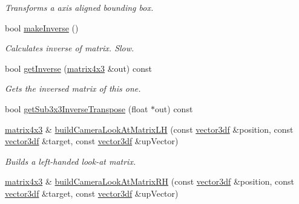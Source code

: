 \begin{DoxyCompactItemize}
\begin{DoxyCompactList}\small\item\em Transforms a axis aligned bounding box. \end{DoxyCompactList}\item 
bool \hyperlink{classirr_1_1core_1_1matrix4x3_a6bfced7bef742a13b927abbb6fc918b1}{make\+Inverse} ()
\begin{DoxyCompactList}\small\item\em Calculates inverse of matrix. Slow. \end{DoxyCompactList}\item 
bool \hyperlink{classirr_1_1core_1_1matrix4x3_aa2da2761e9586ef35b6a626eb1ffbf61}{get\+Inverse} (\hyperlink{classirr_1_1core_1_1matrix4x3}{matrix4x3} \&out) const 
\begin{DoxyCompactList}\small\item\em Gets the inversed matrix of this one. \end{DoxyCompactList}\item 
bool \hyperlink{classirr_1_1core_1_1matrix4x3_ab38d1ed86236532b9853146eae03019a}{get\+Sub3x3\+Inverse\+Transpose} (float $\ast$out) const 
\item 
\hyperlink{classirr_1_1core_1_1matrix4x3}{matrix4x3} \& \hyperlink{classirr_1_1core_1_1matrix4x3_a702d01f5c471c43b051b9f9176d17a4d}{build\+Camera\+Look\+At\+Matrix\+LH} (const \hyperlink{namespaceirr_1_1core_a06f169d08b5c429f5575acb7edbad811}{vector3df} \&position, const \hyperlink{namespaceirr_1_1core_a06f169d08b5c429f5575acb7edbad811}{vector3df} \&target, const \hyperlink{namespaceirr_1_1core_a06f169d08b5c429f5575acb7edbad811}{vector3df} \&up\+Vector)\hypertarget{classirr_1_1core_1_1matrix4x3_a702d01f5c471c43b051b9f9176d17a4d}{}\label{classirr_1_1core_1_1matrix4x3_a702d01f5c471c43b051b9f9176d17a4d}

\begin{DoxyCompactList}\small\item\em Builds a left-\/handed look-\/at matrix. \end{DoxyCompactList}\item 
\hyperlink{classirr_1_1core_1_1matrix4x3}{matrix4x3} \& \hyperlink{classirr_1_1core_1_1matrix4x3_a2e09aa402aa79b259d18f19dc09541eb}{build\+Camera\+Look\+At\+Matrix\+RH} (const \hyperlink{namespaceirr_1_1core_a06f169d08b5c429f5575acb7edbad811}{vector3df} \&position, const \hyperlink{namespaceirr_1_1core_a06f169d08b5c429f5575acb7edbad811}{vector3df} \&target, const \hyperlink{namespaceirr_1_1core_a06f169d08b5c429f5575acb7edbad811}{vector3df} \&up\+Vector)\hypertarget{classirr_1_1core_1_1matrix4x3_a2e09aa402aa79b259d18f19dc09541eb}{}\label{classirr_1_1core_1_1matrix4x3_a2e09aa402aa79b259d18f19dc09541eb}


\end{DoxyCompactItemize}
